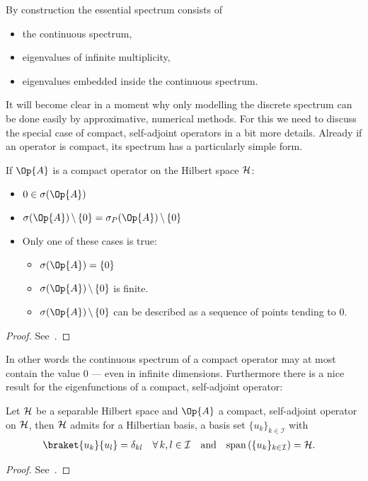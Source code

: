 \noindent
By construction the essential spectrum consists of
\begin{itemize}
	\item the continuous spectrum,
	\item eigenvalues of infinite multiplicity,
	\item eigenvalues embedded inside the continuous spectrum.
\end{itemize}
It will become clear in a moment
why only modelling the discrete spectrum can be done easily by
approximative, numerical methods.
For this we need to discuss the special case of
compact, self-adjoint operators in a bit more details.
Already if an operator is compact,
its spectrum has a particularly simple form.
\begin{prop}
	\label{prop:CompactSpectrum}
	If $\Op{A}$ is a compact operator on the Hilbert space $\mathcal{H}$:
	\begin{itemize}
		\item $0 \in \sigma(\Op{A})$
		\item $\sigma(\Op{A}) \, \backslash \, \{0\}
			= \sigma_P(\Op{A}) \, \backslash \, \{0\}$
		\item Only one of these cases is true:
			\begin{itemize}
				\item[\textopenbullet] $\sigma(\Op{A}) = \{0\}$
				\item[\textopenbullet] $\sigma(\Op{A}) \, \backslash \, \{0\}$ is finite.
				\item[\textopenbullet]
					$\sigma(\Op{A}) \, \backslash \, \{0\}$ can be described
					as a sequence of points tending to $0$.
			\end{itemize}
	\end{itemize}
	\begin{proof}
		See~\cite[p. 56]{Helffer2013}.
	\end{proof}
\end{prop}
In other words the continuous spectrum of a compact operator
may at most contain the value $0$ --- even in infinite dimensions.
Furthermore there is a nice result for the eigenfunctions of a compact, self-adjoint
operator:
\begin{prop}
	\label{prop:CompactBasis}
	Let $\mathcal{H}$ be a separable Hilbert space and $\Op{A}$ a compact,
	self-adjoint operator on $\mathcal{H}$,
	then $\mathcal{H}$ admits for a Hilbertian basis,
	\ie a basis set $\{ u_k \}_{k \in \mathcal{I}}$ with
	\begin{align*}
	\braket{u_k}{u_l} &= \delta_{kl} \quad \forall \, k,l \in \mathcal{I}
	&&\text{and}&
	\spacespan \left( \{ u_k \}_{k \in \mathcal{I}} \right) &= \hilbert.
	\end{align*}
	\begin{proof}
		See~\cite[p. 60]{Helffer2013}.
	\end{proof}
\end{prop}

